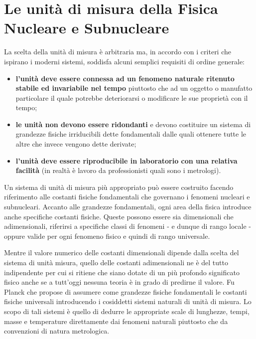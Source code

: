 
\section{Le unità di misura della Fisica Nucleare e Subnucleare}
\label{sec:unita-di-misura}

La scelta della unità di misura è arbitraria ma, in accordo con i criteri che ispirano i moderni sistemi, soddisfa alcuni semplici requisiti di ordine generale:
\begin{itemize}
    \item  \textbf{l'unità deve essere connessa ad un fenomeno naturale ritenuto stabile ed invariabile nel tempo} piuttosto che ad un oggetto o manufatto particolare il quale potrebbe deteriorarsi o modificare le sue proprietà con il tempo;
    \item  \textbf{le unità non devono essere ridondanti} e devono costituire un sistema di grandezze fisiche irriducibili dette fondamentali dalle quali ottenere tutte le altre che invece vengono dette derivate;
    \item  \textbf{l'unità deve essere riproducibile in laboratorio con una relativa facilità} (in realtà è lavoro da professionisti quali sono i metrologi).

\end{itemize}

Un sistema di unità di misura più appropriato può essere costruito facendo riferimento alle costanti fisiche fondamentali che governano i fenomeni nucleari e subnucleari.
Accanto alle grandezze fondamentali, ogni area della fisica introduce anche specifiche costanti fisiche.
Queste possono essere sia dimensionali che adimensionali, riferirsi a specifiche classi di fenomeni - e dunque di rango locale - oppure valide per ogni fenomeno fisico e quindi di rango universale.

Mentre il valore numerico delle costanti dimensionali dipende dalla scelta del sistema di unità misura, quello delle
costanti adimensionali ne è del tutto indipendente per cui si ritiene che siano dotate di un più profondo significato
fisico anche se a tutt’oggi nessuna teoria è in grado di predirne il valore.
Fu Planck che propose di assumere come grandezze fisiche fondamentali le costanti fisiche universali introducendo i
cosiddetti sistemi naturali di unità di misura.
Lo scopo di tali sistemi è quello di dedurre le appropriate scale di lunghezze, tempi, masse e temperature direttamente
dai fenomeni naturali piuttosto che da convenzioni di natura metrologica.

